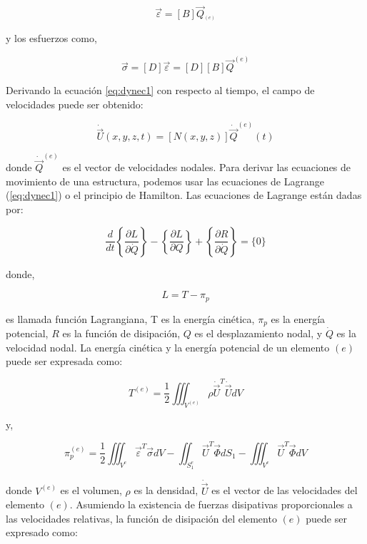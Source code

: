 \begin{equation}
\vec{\varepsilon} = [B] \vec{Q}_^{(e)}
\end{equation}

y los esfuerzos como,

\begin{equation}
\vec{\sigma} = [D] \vec{\varepsilon} = [D][B] \vec{Q}^{(e)}
\end{equation}

Derivando la ecuación \ref{eq:dynec1} con respecto al tiempo, el campo de velocidades puede ser obtenido: 

\begin{equation}
\dot{\vec{U}}(x,y,z,t) = [N(x,y,z)]\dot{\vec{Q}}^{(e)} (t)
\end{equation}

donde $\dot{\vec{Q}}^{(e)}$ es el vector de velocidades nodales. Para derivar las ecuaciones de movimiento de 
una estructura, podemos usar las ecuaciones de Lagrange (\ref{eq:dynec1}) o el principio de Hamilton. Las 
ecuaciones de Lagrange están dadas por:

\begin{equation}
\frac{d}{dt} \left\{ \frac{\partial L}{\partial \dot{Q}} \right\}- 
\left\{ \frac{\partial L}{\partial Q} \right\} + 
\left\{ \frac{\partial R}{\partial \dot{Q}} \right\} = \{0\}
\end{equation}

donde,

\begin{equation}
L = T - \pi_p
\end{equation}

es llamada función Lagrangiana, T es la energía cinética, $\pi_p$ es la energía potencial, $R$ es 
la función de disipación, $Q$ es el desplazamiento nodal, y $\dot{Q}$ es la velocidad nodal.
La energía cinética y la energía potencial de un elemento $(e)$ puede ser expresada como:

\begin{equation}
T^{(e)}	= \frac{1}{2} \iiint_{V^{(e)}} \rho \dot{\vec{U}}^T \dot{\vec{U}} dV
\end{equation}

y,

\begin{equation}
\pi_p^{(e)} = \frac{1}{2} 
\iiint_{V^e} \vec{\varepsilon}^T \vec{\sigma} dV  - 
\iint_{S_1^e} \vec{U}^T \vec{\Phi} dS_1  - 
\iiint_{V^e} \vec{U}^T \vec{\Phi} dV
\end{equation}

donde $V^{(e)}$ es el volumen, $\rho$ es la densidad, $\dot{\vec{U}}$ es el vector de las velocidades del elemento $(e)$. 
Asumiendo la existencia de fuerzas disipativas proporcionales a las velocidades relativas, la función de disipación del 
elemento $(e)$ puede ser expresado como:

